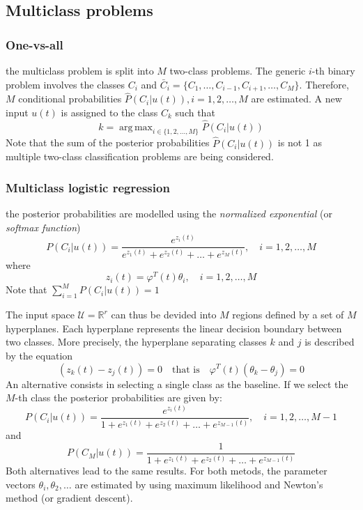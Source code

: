 \documentclass{book}
\DeclareMathOperator*{\argmax}{arg\,max}
\theoremstyle{definition}
\theoremstyle{remark}
\theoremstyle{remark}
\begin{document}
\subsection{Multiclass problems}
\subsubsection{One-vs-all}
the multiclass problem is split into $M$ two-class problems. The generic $i$-th binary problem involves the classes $C_i$ and $\bar{C}_i = \{C_1,\dots,C_{i-1},C_{i+1},\dots,C_M\}$. Therefore, $M$ conditional probabilities $\hat{P}(C_i|u(t)),i=1,2,\dots,M$ are estimated. A new input $u(t)$ is assigned to the class $C_k$ such that 
\[
    k = \argmax_{i\in \{1,2,\dots,M\}}\hat{P}(C_i|u(t))
\]
Note that the sum of the posterior probabilities $\hat{P}(C_i|u(t))$ is not 1 as multiple two-class classification problems are being considered.
\subsubsection{Multiclass logistic regression}
the posterior probabilities are modelled using the \emph{normalized exponential} (or \emph{softmax function})
\[
    P(C_i|u(t))=\displaystyle\frac{e^{z_i(t)}}{e^{z_1(t)}+e^{z_2(t)}+\dots+e^{z_M(t)}}, \quad i=1,2,\dots,M
\]
where 
\[
    z_i(t)=\varphi^T(t)\theta_i, \quad i=1,2,\dots,M
\]
Note that $\displaystyle\sum_{i=1}^{M}P(C_i|u(t))=1$

The input space $\mathcal{U}=\mathbb{R}^r$ can thus be devided into $M$ regions defined by a set of $M$ hyperplanes. Each hyperplane represents the linear decision boundary between two classes. More precisely, the hyperplane separating classes $k$ and $j$ is described by the equation 
\[
    (z_k(t)-z_j(t)) = 0 \quad \text{that is} \quad \varphi^T(t)(\theta_k-\theta_j)=0
\]
An alternative consists in selecting a single class as the baseline. If we select the $M$-th class the posterior probabilities are given by:
\[
    P(C_i|u(t)) = \displaystyle\frac{e^{z_i(t)}}{1+e^{z_1(t)}+e^{z_2(t)}+\dots+e^{z_{M-1}(t)}}, \quad i=1,2,\dots, M-1
\]
and
\[
    P(C_M|u(t)) = \displaystyle\frac{1}{1+e^{z_1(t)}+e^{z_2(t)}+\dots+e^{z_{M-1}(t)}}
\]
Both alternatives lead to the same results. For both metods, the parameter vectors $\theta_i,\theta_2,\dots$ are estimated by using maximum likelihood and Newton's method (or gradient descent).
\end{document}
